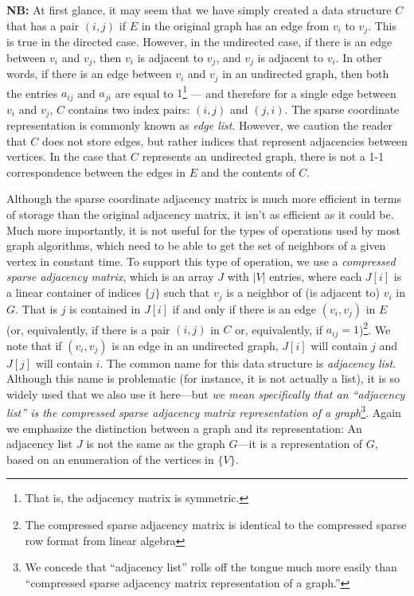 \textbf{NB:} At first glance, it may seem that we have simply created a data structure $C$ that has a pair $(i,j)$ if $E$ in the
original graph has an edge from $v_i$ to $v_j$.  This is true in the directed case.  However, in the undirected case, if there is an edge between $v_i$ and $v_j$, then $v_i$ is adjacent to $v_j$, and $v_j$ is adjacent to $v_i$.  In other words, if there is an edge between $v_i$ and  $v_j$ in an undirected graph, then both the entries $a_{ij}$ and $a_{ji}$ are equal to $1$\footnote{That is, the adjacency matrix is symmetric.} --- and therefore for a single edge between $v_i$ and $v_j$,  $C$ contains two index pairs: $(i, j)$  and $(j, i)$.   The sparse coordinate representation is commonly known as \emph{edge list}.  However, we caution the reader that $C$ does not store edges, but rather indices that represent adjacencies between vertices.  In the case that $C$ represents an undirected graph, there is not a 1-1 correspondence between the edges in $E$ and the contents of $C$.

Although the sparse coordinate adjacency matrix is much more efficient in terms of storage than the original adjacency matrix, it isn't as efficient as it could be.  
Much more importantly, it is not useful for the types of operations used by most graph algorithms, which need to be able to get the set of neighbors of a given vertex in constant time.  
To support this type of operation, we use a \emph{compressed sparse adjacency matrix}, which is an array $J$ with $|V|$ entries, where each $J[i]$ is a linear container of indices $\{ j \}$ such that $v_j$ is a neighbor of (is adjacent to) $v_i$ in $G$.  
That is $j$ is contained in $J[i]$ if and only if there is an edge $(v_i, v_j)$ in $E$ (or, equivalently, if there is a pair $(i, j)$ in $C$ or, equivalently, if $a_{ij} = 1$)\footnote{The compressed sparse adjacency matrix is identical to the compressed sparse row format from linear algebra}.  
We note that if $(v_i, v_j)$ is an edge in an undirected graph, $J[i]$ will contain $j$ and $J[j]$ will contain $i$. 
The common name for this data structure is \emph{adjacency list}.  
Although this name is problematic (for instance, it is not actually a list),  it is so widely used that we also use it here---but \emph{we mean specifically that an  ``adjacency list'' is the compressed sparse adjacency matrix representation of a graph}\footnote{We concede that ``adjacency list'' rolls off the tongue much more easily than ``compressed sparse adjacency matrix representation of a graph.''}.  
Again we emphasize the distinction between a graph and its representation:  An adjacency list $J$ is not the same as the graph $G$---it is a representation of $G$, based on an enumeration of the vertices in $\{V\}$.

